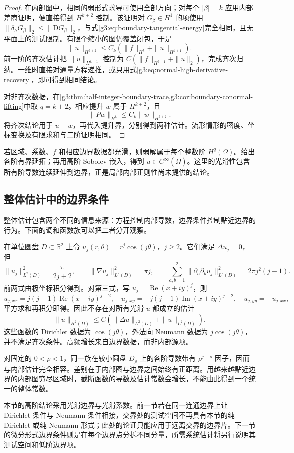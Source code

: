 \begin{proof}
	在内部图中，相同的弱形式求导可使用全部方向；对每个 \(|\beta|=k\) 应用内部差商证明，便直接得到 \(H^{k+2}\) 控制。该证明对 \(G_\beta\in H^1\) 的项使用
	\(\|\delta_hG_\beta\|_2\le\|\mathrm DG_\beta\|_2\)，与式\eqref{g3:eq:boundary-tangential-energy}完全相同，且无平面上的测试限制。有限个缩小的图仍覆盖闭包，于是
	\[
	\|u\|_{H^{k+2}}\le C_k(\|f\|_{H^k}+\|u\|_{H^{k+1}}).
	\]
	前一阶的齐次估计把 \(\|u\|_{H^{k+1}}\) 控制为
	\(C(\|f\|_{H^{k-1}}+\|u\|_2)\)，完成齐次归纳。一维时直接对通量方程递推，或只用式\eqref{g3:eq:normal-high-derivative-recovery}，即可得到相同结论。

	对非齐次数据，在\cref{g3:thm:half-integer-boundary-trace,g3:cor:boundary-conormal-lifting}中取 \(q=k+2\)。相应提升 \(w\) 属于 \(H^{k+2}\)，且
	\[
	\|Pw\|_{H^k}\le C_k\|w\|_{H^{k+2}}.
	\]
	将齐次结论用于 \(u-w\)，再代入提升界，分别得到两种估计。流形情形的密度、坐标变换及有限求和与二阶证明相同。
\end{proof}

若区域、系数、\(f\) 和相应边界数据都光滑，则弱解属于每个整数阶 \(H^q(\Omega)\)。给出各阶有界延拓；再用高阶 Sobolev 嵌入，得到 \(u\in C^\infty(\overline\Omega)\)。这里的光滑性包含所有阶导数连续延伸到边界，正是局部内部正则性尚未提供的结论。

\subsection{整体估计中的边界条件}
\label{g3:subsec:1402:05}
整体估计包含两个不同的信息来源：方程控制内部导数，边界条件控制贴近边界的行为。下面的调和函数族可以把二者分开观察。

\begin{example}\label{g3:exm:harmonic-boundary-growth}
	在单位圆盘 \(D\subset\mathbb R^2\) 上令
	\(u_j(r,\theta)=r^j\cos(j\theta)\)，\(j\ge2\)。它们满足
	\(\Delta u_j=0\)，但
	\[
	\|u_j\|_{L^2(D)}^2=\frac{\pi}{2j+2},\qquad
	\|\nabla u_j\|_{L^2(D)}^2=\pi j,\qquad
	\sum_{a,b=1}^2\|\partial_a\partial_bu_j\|_{L^2(D)}^2
							=2\pi j^2(j-1).
	\]
	前两式由极坐标积分得到。对第三式，写 \(u_j=\operatorname{Re}(x+iy)^j\)，则
	\[
	u_{j,xx}=j(j-1)\operatorname{Re}(x+iy)^{j-2},\quad
	u_{j,xy}=-j(j-1)\operatorname{Im}(x+iy)^{j-2},\quad
	u_{j,yy}=-u_{j,xx},
	\]
	平方求和再积分即得。因此不存在对所有光滑 \(u\) 都成立的估计
	\[
	\|u\|_{H^2(D)}\le C(\|\Delta u\|_{L^2(D)}+\|u\|_{L^2(D)}).
	\]
	这些函数的 Dirichlet 数据为 \(\cos(j\theta)\)，外法向 Neumann 数据为 \(j\cos(j\theta)\)，并不满足齐次条件。高频增长来自边界数据，而非内部源项。
\end{example}

对固定的 \(0<\rho<1\)，同一族在较小圆盘 \(D_\rho\) 上的各阶导数带有 \(\rho^{j-s}\) 因子，因而与内部估计完全相容。差别在于内部图与边界之间始终有正距离。用越来越贴近边界的内部图穷尽区域时，截断函数的导数及估计常数会增长，不能由此得到一个统一的整体常数。

\ProseParagraphBreak
本节的高阶结论采用光滑边界与光滑系数。前一节若在同一连通边界上让 Dirichlet 条件与 Neumann 条件相接，交界处的测试空间不再具有本节的纯 Dirichlet 或纯 Neumann 形式；此处的论证只能应用于远离交界的边界片。下一节的微分形式边界条件则是在每个边界点分拆不同分量，所需系统估计将另行说明其测试空间和低阶边界项。
